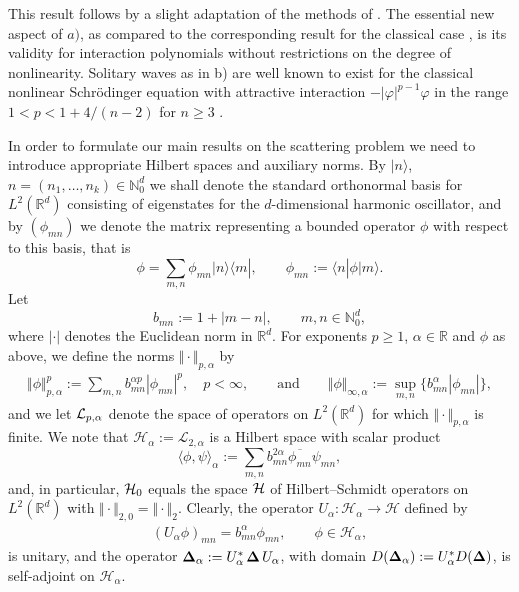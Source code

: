 \documentclass[10pt,a4paper]{amsart}
\begin{document}
This result follows by a slight adaptation of the methods of \cite{DJN,DJ}.
 The essential new aspect of $a)$, as compared to the corresponding
result for the  classical case \cite[Theorem 3.2]{Strauss}, is its validity for
interaction polynomials without
restrictions on the degree of nonlinearity. Solitary waves as in b)
 are well known to exist for the classical nonlinear
Schr{\"o}dinger equation with attractive interaction
$-|\varphi|^{p-1}\varphi$ in the range $1<p<1+4/(n-2)$ for  $n\geq 3$ \cite{CaLi,GSS,ShStrauss}.



 In order to formulate our main results on the scattering problem we
need to introduce ap\-propriate Hilbert spaces and auxiliary norms.
By $\vert n\rangle$, $n=(n_1,\dots,n_k)\in\mathbb N_0^d$ we shall denote the
standard orthonormal basis for $L^2(\mathbb R^d)$ consisting of
eigenstates for the $d$-dimensional harmonic oscillator, and by
$(\phi_{mn})$ we denote the matrix representing a bounded operator
$\phi$ with respect to this basis, that is
\[
\phi = \sum_{m,n}\phi_{mn}\vert n\rangle\langle m|,\qquad \phi_{mn}:=\langle n|\phi|m\rangle .
\]
Let
\[
b_{mn} := 1+|m-n| ,\qquad m,n\in \mathbb N_0^d ,
\]
where $|\cdot|$ denotes the Euclidean norm in $\mathbb R^d$. For
exponents $p\geq 1$, $\alpha\in\mathbb R$ and $\phi$ as above, we def\/ine
the norms $\Vert\cdot \Vert_{p,\alpha}$  by
\begin{gather}
\label{alphanorms}
\Vert\phi\Vert_{p,\alpha}^p := \sum_{m,n}b_{mn}^{\alpha p}|\phi_{mn}|^p ,
\quad p<\infty, \qquad\mbox{and}\qquad
\Vert\phi\Vert_{\infty,\alpha}:=\sup_{m,n}\{b_{mn}^\alpha|\phi_{mn}|\} ,
\end{gather}
and we let ${\cal L}_{p,\alpha}$ denote the space of operators
on $L^2(\mathbb R^d)$ for which
$\Vert\cdot \Vert_{p,\alpha}$ is f\/inite. We note that
$\mathcal H_{\alpha}:=\mathcal L_{2,\alpha}$ is a  Hilbert space with
scalar product
\[
\langle\phi,\psi\rangle_\alpha:=\sum_{m,n}b_{mn}^{2\alpha} \overline{\phi_{mn}}
 \psi_{mn} ,
\]
and, in particular, ${\cal H}_{0}$ equals  the space $\cal H$ of
Hilbert--Schmidt operators on $L^2(\mathbb R^d)$ with $\Vert\cdot\Vert_{2,0} =
\Vert\cdot\Vert_2$.
Clearly, the operator $U_\alpha:\mathcal H_\alpha\to \mathcal H$ def\/ined by
\begin{gather}\label{Ualpha}
(U_\alpha\phi)_{mn}=
b^{\alpha}_{mn}\phi_{mn} ,\qquad \phi\in\mathcal H_\alpha ,
\end{gather}
is unitary, and the operator
${\bf\Delta}_\alpha := U_\alpha^*\, {\bf \Delta}\,U_\alpha$, with domain
$D({\bf\Delta}_\alpha):=U_\alpha^* D({\bf \Delta})$,
 is self-adjoint on $\mathcal H_\alpha$.
\end{document}
